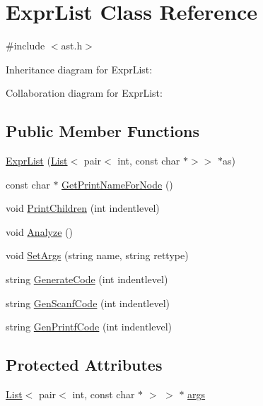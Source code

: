 \hypertarget{class_expr_list}{}\section{Expr\+List Class Reference}
\label{class_expr_list}


{\ttfamily \#include $<$ast.\+h$>$}



Inheritance diagram for Expr\+List\+:


Collaboration diagram for Expr\+List\+:
\subsection*{Public Member Functions}
\begin{DoxyCompactItemize}
\item 
\hyperlink{class_expr_list_ad7fa8764d55851639add773477d80a26}{Expr\+List} (\hyperlink{class_list}{List}$<$ pair$<$ int, const char $\ast$$>$$>$ $\ast$as)
\item 
const char $\ast$ \hyperlink{class_expr_list_a1e1febf2b8902accb2751e521b0e16ae}{Get\+Print\+Name\+For\+Node} ()
\item 
void \hyperlink{class_expr_list_a2a55a32d64cd33b4424d29f1a36e94f8}{Print\+Children} (int indentlevel)
\item 
void \hyperlink{class_expr_list_ade8c035ff7457f304c32066712d55e2e}{Analyze} ()
\item 
void \hyperlink{class_expr_list_a09056537b95e88b367a1cfa306ed2349}{Set\+Args} (string name, string rettype)
\item 
string \hyperlink{class_expr_list_aabde20280604379c3e0aa4396b0ea98d}{Generate\+Code} (int indentlevel)
\item 
string \hyperlink{class_expr_list_a6174594c14ca2b1bedadc7a30aa145c5}{Gen\+Scanf\+Code} (int indentlevel)
\item 
string \hyperlink{class_expr_list_a4a4b3abb07a05a8be2d62cdcbcd5c070}{Gen\+Printf\+Code} (int indentlevel)
\end{DoxyCompactItemize}
\subsection*{Protected Attributes}
\begin{DoxyCompactItemize}
\item 
\hyperlink{class_list}{List}$<$ pair$<$ int, const char $\ast$ $>$ $>$ $\ast$ \hyperlink{class_expr_list_a4f32b04d153d6d304265ecfdb16929c2}{args}
\end{DoxyCompactItemize}



